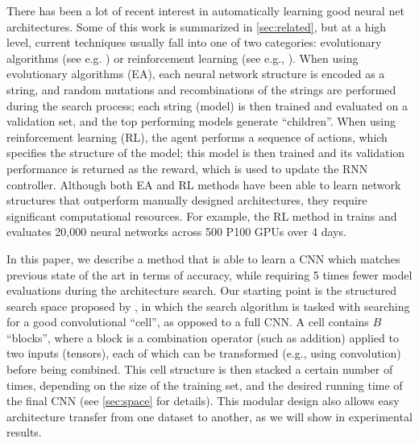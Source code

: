 \documentclass[runningheads]{llncs}
\begin{document}
There has been a lot of recent interest in automatically learning good neural net architectures.
Some of this work is summarized in \cref{sec:related}, but at a high level,
current techniques
usually fall into one of two categories: evolutionary algorithms 
(see e.g. \cite{DBLP:conf/icml/RealMSSSTLK17,Miikkulainen2017,DBLP:journals/corr/XieY17})
or reinforcement learning
(see e.g., \cite{DBLP:journals/corr/ZophL16,DBLP:journals/corr/ZophVSL17,Zhong2018,Cai2017,DBLP:journals/corr/BakerGNR16}).
When using evolutionary algorithms (EA), each neural network structure is encoded as a string, and random mutations and recombinations of the strings are performed during the search process;
each string (model) is then trained and evaluated on a validation set,
and the top performing models generate  ``children''.
When using reinforcement learning (RL),  the agent performs a sequence of actions, which specifies the structure of the model; this model is then trained and its validation performance is returned as the reward, which is used to update the RNN controller.
Although both EA and RL methods have been able to learn network structures that outperform manually designed architectures, they require significant computational resources.
For example, the RL method in
\cite{DBLP:journals/corr/ZophVSL17} 
trains and evaluates 20,000 neural networks across 500 P100 GPUs over 4 days.


In this paper, we describe a method that is able to learn a CNN which matches previous state of the art in terms of accuracy,
while requiring 5 times fewer model evaluations during the architecture search.
Our starting point is the structured search space
proposed by \cite{DBLP:journals/corr/ZophVSL17}, in which the search algorithm is tasked with searching for a good convolutional ``cell'', as opposed to a full CNN.
A cell contains $B$ ``blocks'', where a block is a combination operator (such as addition) applied to two inputs (tensors), each of which can be transformed (e.g., using convolution) before being combined.
This cell structure is then stacked a certain number of times, depending on the size of the training set, and the desired running time of the final CNN
(see \cref{sec:space} for details).
This modular design also allows easy architecture transfer from one dataset to another,
as we will show in experimental results.
\end{document}
